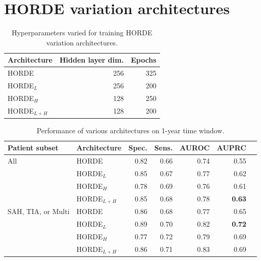 \documentclass{article}
\begin{document}
\section{HORDE variation architectures}


\begin{table}
    \caption{
      Hyperparameters varied for training HORDE variation architectures.
    }
    \label{tab:exp}
    \centering
    \centering
    \label{tab:exp-synth}
    \begin{small}
    \begin{sc}
    \begin{tabular}{lrr}
    \toprule
    Architecture & Hidden layer dim. & Epochs \\
    \toprule
    HORDE & 256 & 325 \\
    HORDE$_L$ & 256 & 200 \\
    HORDE$_H$ & 128 & 250 \\
    HORDE$_{L+H}$ & 128 & 200 \\
    \bottomrule
    \end{tabular}
    \end{sc}
    \end{small}
    \vskip -0.1in
\end{table}

\begin{table}
    \caption{
      Performance of various architectures on 1-year time window.
    }
    \label{tab:exp}
    \centering
    \centering
    \label{tab:exp-synth}
    \begin{small}
    \begin{sc}
    \begin{tabular}{llrrrrr}
    \toprule
    Patient subset & Architecture & Spec. & Sens. & AUROC & AUPRC \\
    \toprule
    All        & HORDE & 0.82 & 0.66 & 0.74 & 0.55 \\
               & HORDE$_L$ & 0.85 & 0.67 & 0.77 & 0.62 \\
               & HORDE$_H$ & 0.78 & 0.69 & 0.76 & 0.61 \\
               & HORDE$_{L+H}$ & 0.85 & 0.68 & 0.78 & \textbf{0.63} \\
    \midrule
    SAH, TIA, or Multi & HORDE & 0.86 & 0.68 & 0.77 & 0.65 \\
               & HORDE$_L$ & 0.89 & 0.70 & 0.82 & \textbf{0.72} \\
               & HORDE$_H$ & 0.77 & 0.72 & 0.79 & 0.69 \\
               & HORDE$_{L+H}$ & 0.86 & 0.71 & 0.83 & 0.69 \\

    \bottomrule
    \end{tabular}
    \end{sc}
    \end{small}
    \vskip -0.1in
\end{table}
\end{document}
